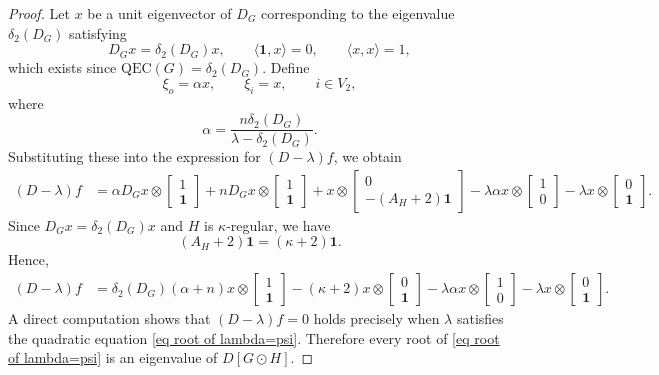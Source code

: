 \documentclass[pdflatex,sn-mathphys-num]{sn-jnl}
\theoremstyle{thmstyleone}%
\theoremstyle{thmstyletwo}%
\theoremstyle{thmstylethree}%
\begin{document}
\begin{proof}
Let $x$ be a unit eigenvector of $D_G$ corresponding to the eigenvalue
$\delta_2(D_G)$ satisfying
\[
D_Gx=\delta_2(D_G)x,
\qquad
\langle \mathbf1,x\rangle=0,
\qquad
\langle x,x\rangle=1,
\]
which exists since $\mathrm{QEC}(G)=\delta_2(D_G)$. Define
\[
\xi_o=\alpha x, \qquad \xi_i=x, \qquad i\in V_2,
\]
where
\[
\alpha=\frac{n\delta_2(D_G)}{\lambda-\delta_2(D_G)}.
\]
Substituting these into the expression for $(D-\lambda)f$, we obtain
\begin{align*}
(D-\lambda)f
&=\alpha D_Gx\otimes 
\begin{bmatrix}1\\\mathbf1\end{bmatrix}
+nD_Gx\otimes 
\begin{bmatrix}1\\\mathbf1\end{bmatrix}
+x\otimes 
\begin{bmatrix}0\\-(A_H+2)\mathbf1\end{bmatrix}
-\lambda\alpha x\otimes 
\begin{bmatrix}1\\0\end{bmatrix}
-\lambda x\otimes 
\begin{bmatrix}0\\\mathbf1\end{bmatrix}.
\end{align*}
Since $D_Gx=\delta_2(D_G)x$ and $H$ is $\kappa$-regular, we have
\[(A_H+2)\mathbf1=(\kappa+2)\mathbf1.\]
Hence,
\begin{align*}
(D-\lambda)f
&=\delta_2(D_G)(\alpha+n)x\otimes
\begin{bmatrix}1\\\mathbf1\end{bmatrix}
-(\kappa+2)x\otimes
\begin{bmatrix}0\\\mathbf1\end{bmatrix}-\lambda\alpha x\otimes
\begin{bmatrix}1\\0\end{bmatrix}
-\lambda x\otimes
\begin{bmatrix}0\\\mathbf1\end{bmatrix}.
\end{align*}
A direct computation shows that $(D-\lambda)f=0$ holds precisely when
$\lambda$ satisfies the quadratic equation \eqref{eq root of lambda=psi}.
Therefore every root of \eqref{eq root of lambda=psi} is an eigenvalue of
$D[G\odot H]$.


\end{proof}
\end{document}
